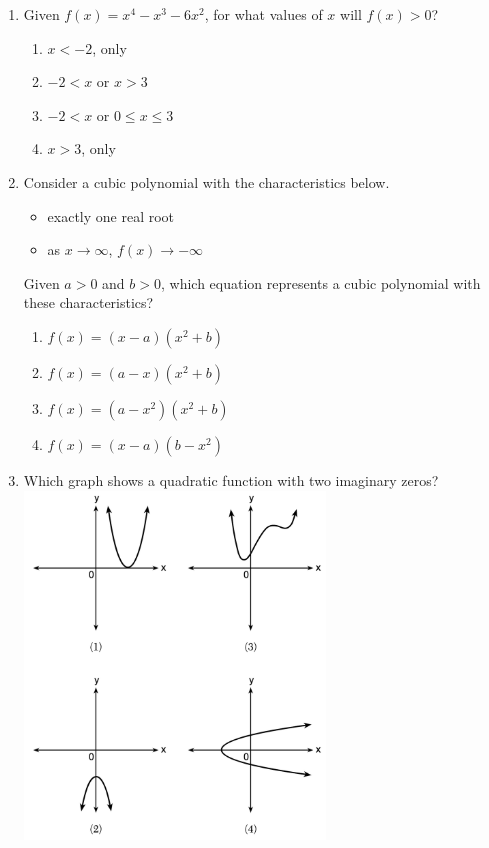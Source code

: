 \documentclass[12pt, twoside]{article}
\begin{document}
\begin{enumerate}[itemsep=0.5cm]
\item Given $f(x) = x^4 - x^3 - 6x^2$, for what values of $x$ will $f(x)>0$? %
\begin{enumerate}
    \item $x<-2$, only
    \item $-2<x$ or $x>3$
    \item $-2<x$ or $0 \le x \le 3$
    \item $x>3$, only
\end{enumerate}

\item  Consider a cubic polynomial with the characteristics below. %
\begin{itemize}
\item exactly one real root
\item as $x \rightarrow \infty$, $f(x) \rightarrow -\infty$
\end{itemize}
Given $a>0$ and $b>0$, which equation represents a cubic
polynomial with these characteristics?
\begin{enumerate}
    \item $f(x) = (x - a)(x^2 + b)$
    \item $f(x) = (a - x)(x^2 + b)$
    \item $f(x) = (a - x^2)(x^2 + b)$
    \item $f(x) = (x - a)(b - x^2)$
\end{enumerate}

\item Which graph shows a quadratic function with two imaginary zeros? \\ %
\includegraphics*[width=8cm]{../graphics/regents-jan2023-24-polynomials.png}


\end{enumerate}
\end{document}
